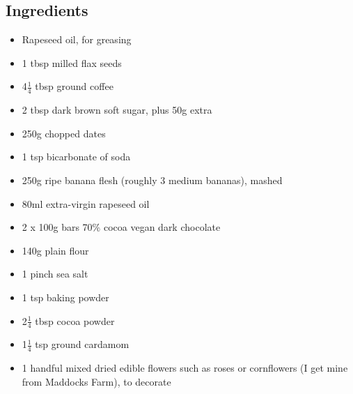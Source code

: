 \documentclass{book}
\begin{document}
\subsection*{Ingredients}
\begin{itemize}
\item Rapeseed oil, for greasing
\item 1 tbsp milled flax seeds
\item 4$\frac{1}{4}$ tbsp ground coffee
\item 2 tbsp dark brown soft sugar, plus 50g extra 
\item 250g chopped dates
\item 1 tsp bicarbonate of soda 
\item 250g ripe banana flesh (roughly 3 medium bananas), mashed 
\item 80ml extra-virgin rapeseed oil 
\item 2 x 100g bars 70\% cocoa vegan dark chocolate
\item 140g plain flour 
\item 1 pinch sea salt 
\item 1 tsp baking powder
\item 2$\frac{1}{4}$ tbsp cocoa powder
\item 1$\frac{1}{4}$ tsp ground cardamom 
\item 1 handful mixed dried edible flowers such as roses or cornflowers (I get mine from Maddocks Farm), to decorate
\end{itemize}
\end{document}
